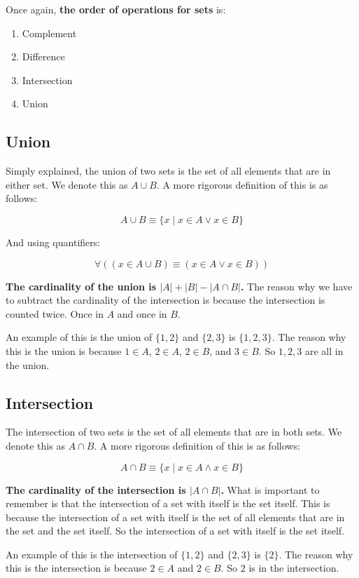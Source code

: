 \documentclass[11pt]{article}
\begin{document}
Once again, \textbf{the order of operations for sets} is:
\begin{enumerate}
\item Complement
\item Difference
\item Intersection
\item Union
\end{enumerate}

\subsection{Union}
\label{sec:orga010009}
Simply explained, the union of two sets is the set of all elements that are in either set. We denote this as \(A \cup B\). A more rigorous definition of this is as follows:

\[
A \cup B \equiv \{x \mid x \in A \lor x \in B\}
\]

And using quantifiers:

\[
\forall ((x \in A \cup B) \equiv (x \in A \lor x \in B))
\]


\textbf{The cardinality of the union is \(|A| + |B| - |A \cap B|\).} The reason why we have to subtract the cardinality of the intersection is because the intersection is counted twice. Once in \(A\) and once in \(B\).

An example of this is the union of \(\{1,2\}\) and \(\{2,3\}\) is \(\{1,2,3\}\). The reason why this is the union is because \(1 \in A\), \(2 \in A\), \(2 \in B\), and \(3 \in B\). So \(1,2,3\) are all in the union.

\subsection{Intersection}
\label{sec:org8a08039}
The intersection of two sets is the set of all elements that are in both sets. We denote this as \(A \cap B\). A more rigorous definition of this is as follows:

\[
A \cap B \equiv \{x \mid x \in A \land x \in B\}
\]

\textbf{The cardinality of the intersection is \(|A \cap B|\).} What is important to remember is that the intersection of a set with itself is the set itself. This is because the intersection of a set with itself is the set of all elements that are in the set and the set itself. So the intersection of a set with itself is the set itself.

An example of this is the intersection of \(\{1,2\}\) and \(\{2,3\}\) is \(\{2\}\). The reason why this is the intersection is because \(2 \in A\) and \(2 \in B\). So \(2\) is in the intersection.
\end{document}
